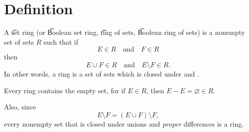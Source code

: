 
\section*{Definition}

A \t{set ring} (or \t{Boolean set ring}, \t{ring of sets}, \t{Boolean ring of sets}) is a nonempty set of sets $R$ such that if
\[
E \in R \quad \text{and} \quad F \in R
\]
then
\[
E \cup F \in R \quad \text{and} \quad E \setminus F \in R.
\]
In other words, a ring is a set of sets which is closed under and .

Every ring contains the empty set, for if $E \in R$, then $E - E = \varnothing \in R$.

Also, since
\[
E \setminus F = (E \cup F) \setminus F,
\]
every nonempty set that is closed under unions and \textit{proper} differences is a ring.

\blankpage